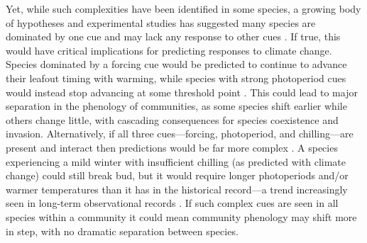 \documentclass[11pt]{article}
\begin{document}
Yet, while such complexities have been identified in some species, a growing body of hypotheses and experimental studies has suggested many species are dominated by one cue and may lack any response to other cues \citep{Korner:2010}. If true, this would have critical implications for predicting responses to climate change. Species dominated by a forcing cue would be predicted to continue to advance their leafout timing with warming, while species with strong photoperiod cues would instead stop advancing at some threshold point \citep{Korner:2010}. This could lead to major separation in the phenology of communities, as some species shift earlier while others change little, with cascading consequences for species coexistence and invasion. Alternatively, if all three cues---forcing, photoperiod, and chilling---are present and interact then predictions would be far more complex \citep{Chuine:1999aa}. A species experiencing a mild winter with insufficient chilling (as predicted with climate change) could still break bud, but it would require longer photoperiods and/or warmer temperatures \citep{Heide:1993b} than it has in the historical record---a trend increasingly seen in long-term observational records \citep[e.g,][]{fu2015,carter2017}. If such complex cues are seen in all species within a community it could mean community phenology may shift more in step, with no dramatic separation between species.
\end{document}
